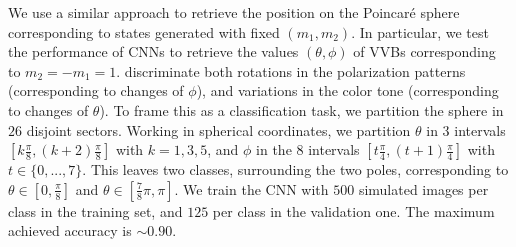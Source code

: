 \documentclass[
	aps, prl, superscriptaddress, twocolumn,
	10pt
	floatfix, 
    nofootinbib,
	tightenlines
]{revtex4-1}
\begin{document}
We use a similar approach to retrieve the position on the Poincar\'e sphere corresponding to states generated with fixed $(m_1,m_2)$.
In particular, we test the performance of CNNs to retrieve the values $(\theta,\phi)$ of VVBs corresponding to $m_2=-m_1=1$.
 discriminate both rotations in the polarization patterns (corresponding to changes of $\phi$), and variations in the color tone (corresponding to changes of $\theta$).
To frame this as a classification task, we partition the sphere in $26$ disjoint sectors.
Working in spherical coordinates, we partition
$\theta$ in $3$ intervals $\left[k \frac{\pi}{8}, (k+2) \frac{\pi}{8}\right]$ with $k=1,3,5$, and $\phi$ in the $8$ intervals $\left[t \frac{\pi}{4}, (t+1) \frac{\pi}{4}\right]$ with $t \in \{0,...,7\} $.
This leaves two classes, surrounding the two poles, corresponding to $\theta \in \left[0, \frac{\pi}{8}\right]$ and $ \theta\in\left[ \frac{7}{8} \pi, \pi\right]$.
We train the CNN with $500$ simulated images per class in the training set, and $125$ per class in the validation one. The maximum achieved accuracy is $\sim 0.90$.
\end{document}
